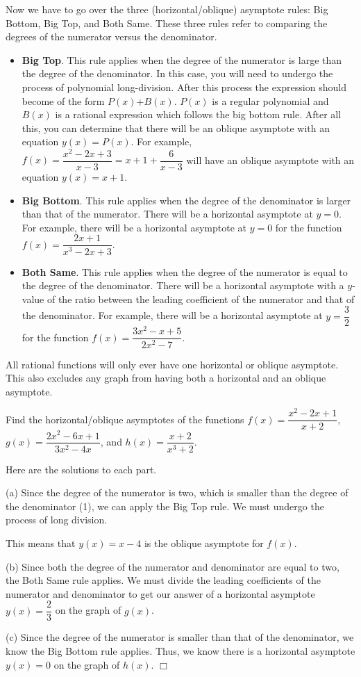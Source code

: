 \documentclass[../book.tex]{subfiles}
\begin{document}
Now we have to go over the three (horizontal/oblique) asymptote rules: Big Bottom, Big Top, and Both Same. These three rules refer to comparing the degrees of the numerator versus the denominator. 
\begin{itemize}
    \item \textbf{Big Top}. This rule applies when the degree of the numerator is large than the degree of the denominator. In this case, you will need to undergo the process of polynomial long-division. After this process the expression should become of the form $P(x)$+$B(x)$. $P(x)$ is a regular polynomial and $B(x)$ is a rational expression which follows the big bottom rule. After all this, you can determine that there will be an oblique asymptote with an equation $y(x)=P(x)$.  For example, $f(x)=\dfrac{x^2-2x+3}{x-3}=x+1+\dfrac{6}{x-3}$ will have an oblique asymptote with an equation $y(x)=x+1$.
    \item \textbf{Big Bottom}. This rule applies when the degree of the denominator is larger than that of the numerator. There will be a horizontal asymptote at $y=0$. For example, there will be a horizontal asymptote at $y=0$ for the function $f(x)=\dfrac{2x+1}{x^3-2x+3}.$
    \item \textbf{Both Same}. This rule applies when the degree of the numerator is equal to the degree of the denominator. There will be a horizontal asymptote with a $y$-value of the ratio between the leading coefficient of the numerator and that of the denominator. For example, there will be a horizontal asymptote at $y=\dfrac{3}{2}$ for the function $f(x)=\dfrac{3x^2-x+5}{2x^2-7}$.
\end{itemize}
\begin{remark}
All rational functions will only ever have one horizontal or oblique asymptote.  This also excludes any graph from having both a horizontal and an oblique asymptote.
\end{remark}
\begin{example}
Find the horizontal/oblique asymptotes of the functions $f(x)=\dfrac{x^2-2x+1}{x+2}$, $g(x)=\dfrac{2x^2-6x+1}{3x^2-4x}$, and $h(x)=\dfrac{x+2}{x^3+2}$.
\end{example}
\begin{solution}
Here are the solutions to each part.

(a)	Since the degree of the numerator is two, which is smaller than the degree of the denominator (1), we can apply the Big Top rule. We must undergo the process of long division.


This means that $y(x)=x-4$ is the oblique asymptote for $f(x)$.

(b) Since both the degree of the numerator and denominator are equal to two, the Both Same rule applies. We must divide the leading coefficients of the numerator and denominator to get our answer of a horizontal asymptote $y(x)=\dfrac{2}{3}$ on the graph of $g(x)$.

(c) Since the degree of the numerator is smaller than that of the denominator, we know the Big Bottom rule applies. Thus, we know there is a horizontal asymptote $y(x)=0$ on the graph of $h(x)$. $\Box$
\end{solution}
\end{document}

